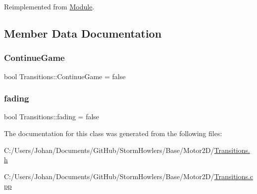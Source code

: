 Reimplemented from \mbox{\hyperlink{class_module_ac1a7b6dca73586b9cce2e67647af58d8}{Module}}.



\subsection{Member Data Documentation}
\mbox{\label{class_transitions_ac2fcd2927e84a6239a67ca292336fbc6}} 
\subsubsection{\texorpdfstring{ContinueGame}{ContinueGame}}
{\footnotesize\ttfamily bool Transitions\+::\+Continue\+Game = false}

\mbox{\label{class_transitions_a0b30954ba48edcc11d62e785ca203174}} 
\subsubsection{\texorpdfstring{fading}{fading}}
{\footnotesize\ttfamily bool Transitions\+::fading = false}



The documentation for this class was generated from the following files\+:\begin{DoxyCompactItemize}
\item 
C\+:/\+Users/\+Johan/\+Documents/\+Git\+Hub/\+Storm\+Howlers/\+Base/\+Motor2\+D/\mbox{\hyperlink{_transitions_8h}{Transitions.\+h}}\item 
C\+:/\+Users/\+Johan/\+Documents/\+Git\+Hub/\+Storm\+Howlers/\+Base/\+Motor2\+D/\mbox{\hyperlink{_transitions_8cpp}{Transitions.\+cpp}}\end{DoxyCompactItemize}
